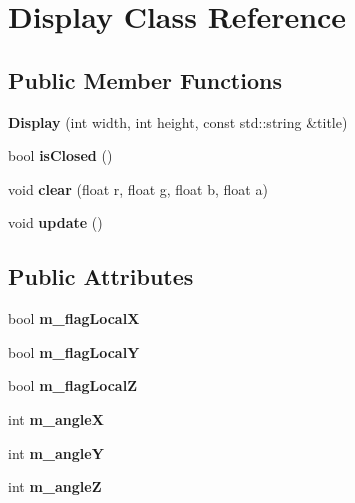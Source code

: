 \hypertarget{classDisplay}{
\section{Display Class Reference}
\label{classDisplay}
}
\subsection*{Public Member Functions}
\begin{DoxyCompactItemize}
\item 
\hypertarget{classDisplay_a87a6f6c52cfc4ba3be9ad262ab3d45a5}{
{\bfseries Display} (int width, int height, const std::string \&title)}
\label{classDisplay_a87a6f6c52cfc4ba3be9ad262ab3d45a5}

\item 
\hypertarget{classDisplay_ad72eae29139375a697766d9fb1450a38}{
bool {\bfseries isClosed} ()}
\label{classDisplay_ad72eae29139375a697766d9fb1450a38}

\item 
\hypertarget{classDisplay_a71e5d06092760e9fecae1aefae3d1110}{
void {\bfseries clear} (float r, float g, float b, float a)}
\label{classDisplay_a71e5d06092760e9fecae1aefae3d1110}

\item 
\hypertarget{classDisplay_ad2740b779d61e461c4dcaaf34f1fcd8f}{
void {\bfseries update} ()}
\label{classDisplay_ad2740b779d61e461c4dcaaf34f1fcd8f}

\end{DoxyCompactItemize}
\subsection*{Public Attributes}
\begin{DoxyCompactItemize}
\item 
\hypertarget{classDisplay_a61c0f57de8661805d1ac5a8579bf99f4}{
bool {\bfseries m\_\-flagLocalX}}
\label{classDisplay_a61c0f57de8661805d1ac5a8579bf99f4}

\item 
\hypertarget{classDisplay_a7f7602ffef9153fce05d89864f5684f4}{
bool {\bfseries m\_\-flagLocalY}}
\label{classDisplay_a7f7602ffef9153fce05d89864f5684f4}

\item 
\hypertarget{classDisplay_ad7a715211ce2747d1333eae01a7ab244}{
bool {\bfseries m\_\-flagLocalZ}}
\label{classDisplay_ad7a715211ce2747d1333eae01a7ab244}

\item 
\hypertarget{classDisplay_a05b7f03be072e546b3310362a25e0f3b}{
int {\bfseries m\_\-angleX}}
\label{classDisplay_a05b7f03be072e546b3310362a25e0f3b}

\item 
\hypertarget{classDisplay_ae8d6a530098c7458d0a42ebc1191da49}{
int {\bfseries m\_\-angleY}}
\label{classDisplay_ae8d6a530098c7458d0a42ebc1191da49}

\item 
\hypertarget{classDisplay_a59037e52b5e33ec5108fa1c9c0779a89}{
int {\bfseries m\_\-angleZ}}
\label{classDisplay_a59037e52b5e33ec5108fa1c9c0779a89}

\end{DoxyCompactItemize}


